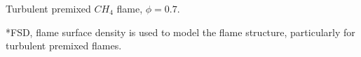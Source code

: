 \documentclass{beamer}
\begin{document}
\begin{frame}
\begin{minipage}[t][1\textheight]{1\textwidth}
\begin{exampleblock}{Turbulent premixed $CH_4$ flame, $\phi=0.7$. }
\begin{figure}
\end{figure}
\vspace{5pt}
\tiny{*FSD, flame surface density is used to model the flame structure, particularly for turbulent premixed flames.}
\vspace{10pt}


\end{exampleblock}
\end{minipage}
\end{frame}
\end{document}
